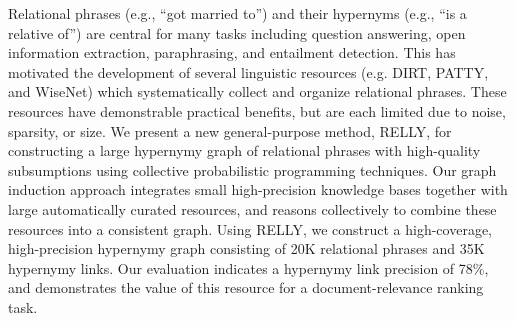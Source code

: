 Relational phrases (e.g., ``got married to'') and their hypernyms (e.g., ``is a relative of'') are central for many tasks including question answering, open information extraction, paraphrasing, and entailment detection. This has motivated the development of several linguistic resources (e.g. DIRT, PATTY, and WiseNet) which systematically collect and organize relational phrases. These resources have demonstrable practical benefits, but are each limited due to noise, sparsity, or size. We present a new general-purpose method, RELLY, for constructing a large hypernymy graph of relational phrases with high-quality subsumptions using collective probabilistic programming techniques. Our graph induction approach integrates small high-precision knowledge bases together with large automatically curated resources, and reasons collectively to combine these resources into a consistent graph. Using RELLY,  we construct a high-coverage, high-precision hypernymy graph consisting of 20K relational phrases and 35K hypernymy links. Our evaluation indicates a hypernymy link precision of 78\%, and demonstrates the value of this resource for a document-relevance ranking task.
